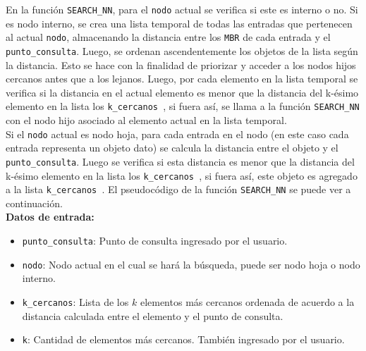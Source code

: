 \documentclass[a4paper]{article}
\begin{document}
En la función \texttt{SEARCH\_NN}, para el \texttt{nodo} actual se verifica si este es interno o no. Si es nodo interno, se crea una lista temporal de todas las entradas que pertenecen al actual \texttt{nodo}, almacenando la distancia entre los  \texttt{MBR} de cada entrada y el \texttt{punto\_consulta}. Luego, se ordenan ascendentemente los objetos de la lista según la distancia. Esto se hace con la finalidad de priorizar y acceder a los nodos hijos cercanos antes que a los lejanos. Luego, por cada elemento en la lista temporal se verifica si la distancia en el actual elemento es menor que la distancia del k-ésimo elemento en la lista los \texttt{k\_cercanos }, si fuera así, se llama a la función \texttt{SEARCH\_NN} con el nodo hijo asociado al elemento actual en la lista temporal. \\

Si el \texttt{nodo} actual es nodo hoja, para cada entrada en el nodo (en este caso cada entrada representa un objeto dato) se calcula la distancia entre el objeto y el \texttt{punto\_consulta}. Luego se verifica si esta distancia es menor que la distancia del k-ésimo elemento en la lista los \texttt{k\_cercanos }, si fuera así, este objeto es agregado a la lista  \texttt{k\_cercanos }. El pseudocódigo de la función \texttt{SEARCH\_NN} se puede ver a continuación.\\

\textbf{Datos de entrada:}
\begin{itemize}
    \item \texttt{punto\_consulta}: Punto de consulta ingresado por el usuario.
    \item \texttt{nodo}: Nodo actual en el cual se hará la búsqueda, puede ser nodo hoja o nodo interno.
    \item \texttt{k\_cercanos}: Lista de los $k$ elementos más cercanos ordenada de acuerdo a la distancia calculada entre el elemento y el punto de consulta.
    \item \texttt{k}: Cantidad de elementos más cercanos. También ingresado por el usuario.\\
\end{itemize}
\end{document}

